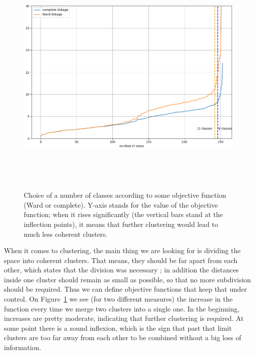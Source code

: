 \documentclass[a4paper,11pt]{article}
\begin{document}
\begin{figure}
\begin{center}
\includegraphics[width=12cm, height=12cm, keepaspectratio]{./img/ward}
\caption{Choice of a number of classes according to some objective function (Ward or complete). Y-axis stands for the value of the objective function; when it rises significantly (the vertical bars stand at the inflection points), it means that further clustering would lead to much less coherent clusters.}
\label{fig:ward}
\end{center}
\end{figure}

When it comes to clustering, the main thing we are looking for is dividing the space into coherent clusters. That means, they should be far apart from each other, which states that the division was necessary ; in addition the distances inside one cluster should remain as small as possible, so that no more subdivision should be required. Thus we can define objective functions that keep that under control. On Figure~\ref{fig:ward} we see (for two different measures) the increase in the function every time we merge two clusters into a single one. In the beginning, increases are pretty moderate, indicating that further clustering is required. At some point there is a sound inflexion, which is the sign that past that limit clusters are too far away from each other to be combined without a big loss of information.
\end{document}
